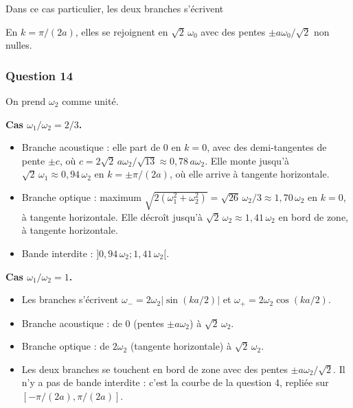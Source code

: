 \documentclass[11pt,a4paper]{article}
\providecommand{\tightlist}{\setlength{\itemsep}{0pt}\setlength{\parskip}{0pt}}
\newcommand{\equationajustee}[1]{%
  \sbox{\boiteequation}{$\displaystyle #1$}%
  \ifdim\wd\boiteequation>\linewidth
    \[\resizebox{\linewidth}{!}{\usebox{\boiteequation}}\]%
  \else
    \[#1\]%
  \fi}
\begin{document}
Dans ce cas particulier, les deux branches s'écrivent

\equationajustee{\begin{aligned}
\omega_-&=2\omega_0\lvert\sin(ka/2)\rvert\\
\omega_+&=2\omega_0\cos(ka/2)
\end{aligned}}

En \(k=\pi/(2a)\), elles se rejoignent en \(\sqrt2\,\omega_0\) avec des pentes \(\pm a\omega_0/\sqrt2\) non nulles.

\hypertarget{question-14}{%
\subsubsection{Question 14}\label{question-14}}

On prend \(\omega_2\) comme unité.

\textbf{Cas \(\omega_1/\omega_2=2/3\).}

\begin{itemize}
\tightlist
\item
  Branche acoustique : elle part de \(0\) en \(k=0\), avec des demi-tangentes de pente \(\pm c\), où \(c=2\sqrt2\,a\omega_2/\sqrt{13}\approx0{,}78\,a\omega_2\). Elle monte jusqu'à \(\sqrt2\,\omega_1\approx0{,}94\,\omega_2\) en \(k=\pm\pi/(2a)\), où elle arrive à tangente horizontale.
\item
  Branche optique : maximum \(\sqrt{2(\omega_1^2+\omega_2^2)}=\sqrt{26}\,\omega_2/3\approx1{,}70\,\omega_2\) en \(k=0\), à tangente horizontale. Elle décroît jusqu'à \(\sqrt2\,\omega_2\approx1{,}41\,\omega_2\) en bord de zone, à tangente horizontale.
\item
  Bande interdite : \(]0{,}94\,\omega_2;1{,}41\,\omega_2[\).
\end{itemize}

\textbf{Cas \(\omega_1/\omega_2=1\).}

\begin{itemize}
\tightlist
\item
  Les branches s'écrivent \(\omega_-=2\omega_2\lvert\sin(ka/2)\rvert\) et \(\omega_+=2\omega_2\cos(ka/2)\).
\item
  Branche acoustique : de \(0\) (pentes \(\pm a\omega_2\)) à \(\sqrt2\,\omega_2\).
\item
  Branche optique : de \(2\omega_2\) (tangente horizontale) à \(\sqrt2\,\omega_2\).
\item
  Les deux branches se touchent en bord de zone avec des pentes \(\pm a\omega_2/\sqrt2\). Il n'y a pas de bande interdite : c'est la courbe de la question 4, repliée sur \([-\pi/(2a),\pi/(2a)]\).
\end{itemize}
\end{document}
